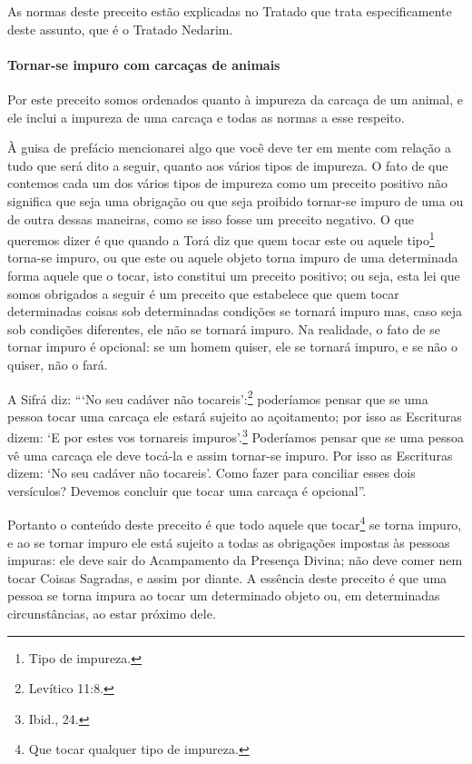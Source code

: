 As normas deste preceito estão explicadas no Tratado que trata
especificamente deste assunto, que é o Tratado Nedarim.

\paragraph{Tornar-se impuro com carcaças de animais}

Por este preceito somos ordenados quanto à impureza da carcaça de um
animal, e ele inclui a impureza de uma carcaça e todas as normas a esse
respeito.

À guisa de prefácio mencionarei algo que você deve ter em mente com
relação a tudo que será dito a seguir, quanto aos vários tipos de
impureza. O fato de que contemos cada um dos vários tipos de impureza
como um preceito positivo não significa que seja uma obrigação ou que
seja proibido tornar-se impuro de uma ou de outra dessas maneiras, como
se isso fosse um preceito negativo. O que queremos dizer é que quando a
Torá diz que quem tocar este ou aquele tipo\footnote{Tipo de impureza.}
torna-se impuro, ou que este ou aquele objeto torna impuro de uma
determinada forma aquele que o tocar, isto constitui um preceito
positivo; ou seja, esta lei que somos obrigados a seguir é um preceito
que estabelece que quem tocar determinadas coisas sob determinadas
condições se tornará impuro mas, caso seja sob condições diferentes, ele
não se tornará impuro. Na realidade, o fato de se tornar impuro é
opcional: se um homem quiser, ele se tornará impuro, e se não o quiser,
não o fará.

A Sifrá diz: ```No seu cadáver não tocareis':\footnote{Levítico 11:8.}
poderíamos pensar que se uma pessoa tocar uma carcaça ele estará
sujeito ao açoitamento; por isso as Escrituras dizem: `E por estes vos
tornareis impuros'.\footnote{Ibid., 24.} Poderíamos pensar que se uma pessoa vê
uma carcaça ele deve tocá-la e assim tornar-se impuro. Por isso as
Escrituras dizem: `No seu cadáver não tocareis'. Como fazer para
conciliar esses dois versículos? Devemos concluir que tocar uma carcaça
é opcional''.


Portanto o conteúdo deste preceito é que todo aquele que
tocar\footnote{Que tocar qualquer tipo de impureza.} se torna impuro, e ao se tornar impuro ele
está sujeito a todas as obrigações impostas às pessoas impuras: ele deve
sair do Acampamento da Presença Divina; não deve comer nem tocar Coisas
Sagradas, e assim por diante. A essência deste preceito é que uma pessoa
se torna impura ao tocar um determinado objeto ou, em determinadas
circunstâncias, ao estar próximo dele.

